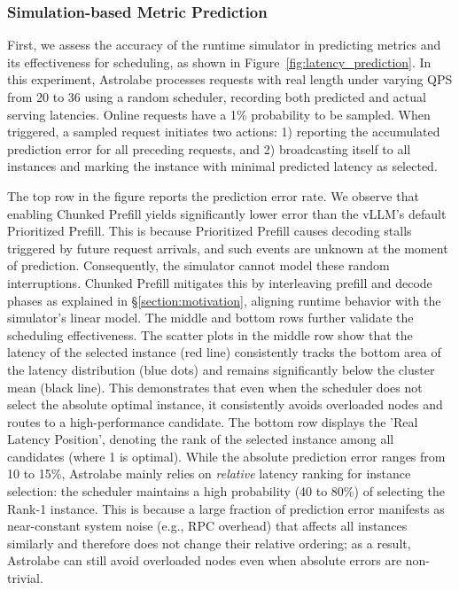 \documentclass[sigconf, review, anonymous]{acmart}
\begin{document}
\subsubsection{Simulation-based Metric Prediction}
First, we assess the accuracy of the runtime simulator in predicting metrics and its effectiveness for scheduling, as shown in Figure~\ref{fig:latency_prediction}. In this experiment, Astrolabe processes requests with real length under varying QPS from 20 to 36 using a random scheduler, recording both predicted and actual serving latencies. Online requests have a 1\% probability to be sampled. When triggered, a sampled request initiates two actions: 1) reporting the accumulated prediction error for all preceding requests, and 2) broadcasting itself to all instances and marking the instance with minimal predicted latency as selected. 



The top row in the figure reports the prediction error rate. We observe that enabling Chunked Prefill yields significantly lower error than the vLLM's default Prioritized Prefill. This is because Prioritized Prefill causes decoding stalls triggered by future request arrivals, and such events are unknown at the moment of prediction. Consequently, the simulator cannot model these random interruptions. Chunked Prefill mitigates this by interleaving prefill and decode phases as explained in \S\ref{section:motivation}, aligning runtime behavior with the simulator's linear model. The middle and bottom rows further validate the scheduling effectiveness. The scatter plots in the middle row show that the latency of the selected instance (red line) consistently tracks the bottom area of the latency distribution (blue dots) and remains significantly below the cluster mean (black line). This demonstrates that even when the scheduler does not select the absolute optimal instance, it consistently avoids overloaded nodes and routes to a high-performance candidate. The bottom row displays the 'Real Latency Position', denoting the rank of the selected instance among all candidates (where 1 is optimal). While the absolute prediction error ranges from 10 to 15\%, Astrolabe mainly relies on \emph{relative} latency ranking for instance selection: the scheduler maintains a high probability (40 to 80\%) of selecting the Rank-1 instance. This is because a large fraction of prediction error manifests as near-constant system noise (e.g., RPC overhead) that affects all instances similarly and therefore does not change their relative ordering; as a result, Astrolabe can still avoid overloaded nodes even when absolute errors are non-trivial.
\end{document}
